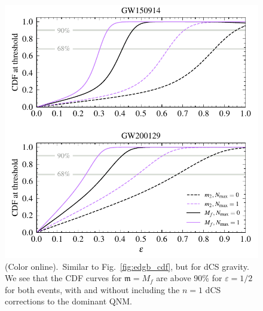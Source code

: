 \documentclass[twocolumn,
               prd,
               aps,
               superscriptaddress,
               tightenlines,
               nofootinbib,
               eqsecnum,
               amsfonts,
               amsmath,
               longbibliography]{revtex4-1}
\newcommand{\gm}{\mathfrak{m}}
\begin{document}
\begin{figure}[t]
\includegraphics[width=\columnwidth]{figs/dcs_cdf_varying_threshold.pdf}
\caption{(Color online).~Similar to Fig.~\ref{fig:edgb_cdf}, but for dCS gravity.
%
We see that the CDF curves for $\gm = M_{f}$ are above 90\% for $\varepsilon =
1/2$ for both events, with and without including the $n = 1$ dCS corrections to
the dominant QNM.
}
\label{fig:dcs_cdf}
\end{figure}
\end{document}
